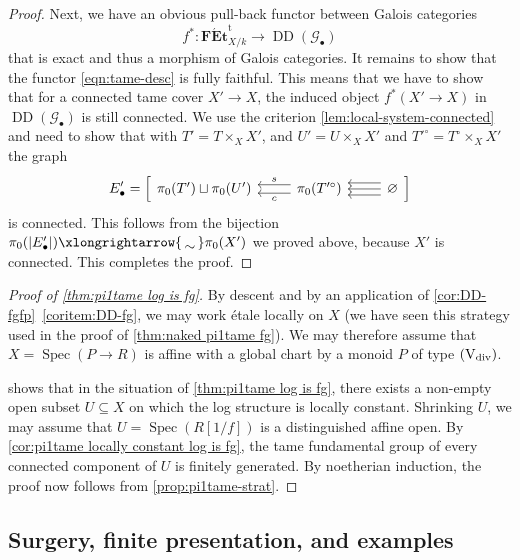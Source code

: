 \documentclass[a4paper,twoside,11pt,reqno]{amsart}
\newcommand{\cG}{{\mathcal G}}
\newcommand{\isomto}{\xlongrightarrow{\,\smash{\raisebox{-0.65ex} 
    {\ensuremath{\displaystyle\sim}}}\,}}
\newcommand{\la}{\longrightarrow}
\DeclareMathOperator{\Spec}{Spec}
\newcommand{\cat}[1]{\mathbf{#1}}
\newcommand{\typeVd}{(\mathrm{V}_{\rm div})}
\newcommand{\FEtt}{{\cat{F\acute{E}t}}^{\!\mathrm{t}}}
\DeclareMathOperator{\Desc}{DD}
\theoremstyle{definition}
\numberwithin{equation}{subsection}
\begin{document}
\begin{proof}
Next, we have an obvious pull-back functor between Galois categories
\begin{equation} \label{eqn:tame-desc}
    f^*\colon \FEtt_{X/k} \la \Desc(\cG_\bullet)
\end{equation}
that is exact and thus a morphism of Galois categories. It remains to show that 
the functor \eqref{eqn:tame-desc} is fully faithful. This means that we have to show that for a connected tame cover $X' \to X$, the induced object $f^*(X'\to X)$ in $\Desc(\cG_\bullet)$ is still connected. We use the criterion \cref{lem:local-system-connected} and need to show that with $T' = T \times_X X'$, and $U' = U \times_X X'$ and $T'^\circ = T^\circ \times_X X'$ the graph
\[
E'_\bullet = \Big[\begin{tikzcd}
        \pi_0(T') \sqcup \pi_0(U') & \ar[l,"c",shift left=0.7ex] \ar[l,"s",swap,shift right=0.7ex] \pi_0(T'^\circ) & \ar[l,shift left=1ex] \ar[l,shift right=1ex] \ar[l] \varnothing  
    \end{tikzcd}\Big]
\]
is connected. This follows from the bijection $\pi_0(|E'_\bullet|) \isomto  \pi_0(X')$
we proved above, because $X'$ is connected. This completes the proof. 
\end{proof}

\begin{proof}[Proof of \cref{thm:pi1tame log is fg}]
By descent \cite[Proposition~4.2.4]{AHLS-Log} and by an application of \cref{cor:DD-fgfp}~\ref{coritem:DD-fg}, we may work \'etale locally on $X$ (we have seen this strategy used in the proof of \cref{thm:naked pi1tame fg}). We may therefore assume that $X=\Spec(P \to R)$ is affine with a global chart by a monoid $P$ of type $\typeVd$.

 shows that in the situation of \cref{thm:pi1tame log is fg}, there exists a non-empty open subset $U\subseteq X$ on which the log structure is locally constant. Shrinking $U$, we may assume that $U=\Spec(R[1/f])$ is a distinguished affine open. By \cref{cor:pi1tame locally constant log is fg}, the tame fundamental group of every connected component of $U$ is finitely generated. By noetherian induction, the proof now follows from \cref{prop:pi1tame-strat}.
\end{proof}


\subsection{Surgery, finite presentation, and examples}
\label{ss:surgery}
\end{document}
